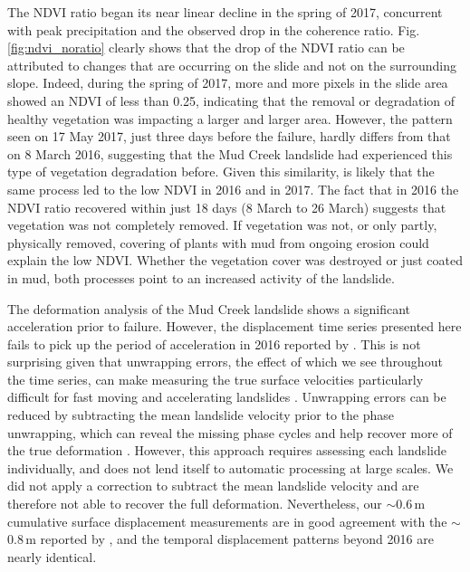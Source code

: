 \documentclass[nhess, manuscript]{copernicus}
\begin{document}
The NDVI ratio began its near linear decline in the spring of 2017, concurrent with peak precipitation and the observed drop in the coherence ratio. Fig. \ref{fig:ndvi_noratio} clearly shows that the drop of the NDVI ratio can be attributed to changes that are occurring on the slide and not on the surrounding slope. Indeed, during the spring of 2017, more and more pixels in the slide area showed an NDVI of less than 0.25, indicating that the removal or degradation of healthy vegetation was impacting a larger and larger area. However, the pattern seen on 17 May 2017, just three days before the failure, hardly differs from that on 8 March 2016, suggesting that the Mud Creek landslide had experienced this type of vegetation degradation before. Given this similarity, is likely that the same process led to the low NDVI in 2016 and in 2017. The fact that in 2016 the NDVI ratio recovered within just 18 days (8 March to 26 March) suggests that vegetation was not completely removed.  If vegetation was not, or only partly, physically removed, covering of plants with mud from ongoing erosion could explain the low NDVI. Whether the vegetation cover was destroyed or just coated in mud, both processes point to an increased activity of the landslide. \par


The deformation analysis of the Mud Creek landslide shows a significant acceleration prior to failure. However, the displacement time series presented here fails to pick up the period of acceleration in 2016 reported by \cite{handwerger2019}. This is not surprising given that unwrapping errors, the effect of which we see throughout the time series, can make measuring the true surface velocities particularly difficult for fast moving and accelerating landslides \citep[e.g.,][]{handwerger2019, dai2020, manconi2018}. Unwrapping errors can be reduced by subtracting the mean landslide velocity prior to the phase unwrapping, which can reveal the missing phase cycles and help recover more of the true deformation \citep{handwerger2015, handwerger2019}. However, this approach requires assessing each landslide individually, and does not lend itself to automatic processing at large scales. We did not apply a correction to subtract the mean landslide velocity and are therefore not able to recover the full deformation. Nevertheless, our $\sim$0.6\,m cumulative surface displacement measurements are in good agreement with the $\sim$0.8\,m reported by \cite{handwerger2019}, and the temporal displacement patterns beyond 2016 are nearly identical. 
\end{document}
